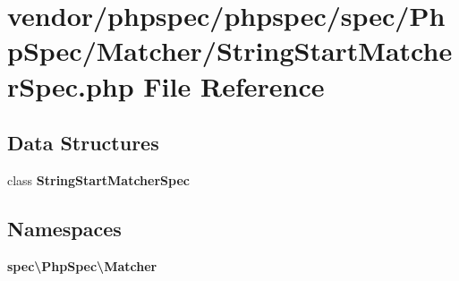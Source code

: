 \section{vendor/phpspec/phpspec/spec/\+Php\+Spec/\+Matcher/\+String\+Start\+Matcher\+Spec.php File Reference}
\label{_string_start_matcher_spec_8php}
\subsection*{Data Structures}
\begin{DoxyCompactItemize}
\item 
class {\bf String\+Start\+Matcher\+Spec}
\end{DoxyCompactItemize}
\subsection*{Namespaces}
\begin{DoxyCompactItemize}
\item 
 {\bf spec\textbackslash{}\+Php\+Spec\textbackslash{}\+Matcher}
\end{DoxyCompactItemize}
